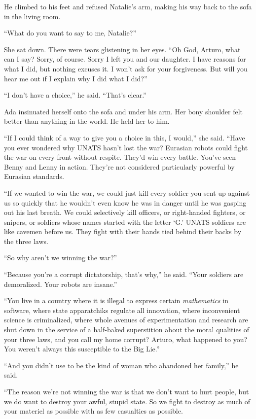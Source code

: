 He climbed to his feet and refused Natalie’s arm, making his way
back to the sofa in the living room.

“What do you want to say to me, Natalie?”

She sat down. There were tears glistening in her eyes. “Oh God,
Arturo, what can I say? Sorry, of course. Sorry I left you and our
daughter. I have reasons for what I did, but nothing excuses it. I
won’t ask for your forgiveness. But will you hear me out if I
explain why I did what I did?”

“I don’t have a choice,” he said. “That’s clear.”

Ada insinuated herself onto the sofa and under his arm. Her bony
shoulder felt better than anything in the world. He held her to
him.

“If I could think of a way to give you a choice in this, I would,”
she said. “Have you ever wondered why UNATS hasn’t lost the war?
Eurasian robots could fight the war on every front without respite.
They’d win every battle. You’ve seen Benny and Lenny in action.
They’re not considered particularly powerful by Eurasian
standards.

“If we wanted to win the war, we could just kill every soldier you
sent up against us so quickly that he wouldn’t even know he was in
danger until he was gasping out his last breath. We could
selectively kill officers, or right-handed fighters, or snipers, or
soldiers whose names started with the letter ‘G.’ UNATS soldiers
are like cavemen before us. They fight with their hands tied behind
their backs by the three laws.

“So why aren’t we winning the war?”

“Because you’re a corrupt dictatorship, that’s why,” he said. “Your
soldiers are demoralized. Your robots are insane.”

“You live in a country where it is illegal to express certain
\emph{mathematics} in software, where state apparatchiks regulate
all innovation, where inconvenient science is criminalized, where
whole avenues of experimentation and research are shut down in the
service of a half-baked superstition about the moral qualities of
your three laws, and you call my home corrupt? Arturo, what
happened to you? You weren’t always this susceptible to the Big
Lie.”

“And you didn’t use to be the kind of woman who abandoned her
family,” he said.

“The reason we’re not winning the war is that we don’t want to hurt
people, but we do want to destroy your awful, stupid state. So we
fight to destroy as much of your materiel as possible with as few
casualties as possible.

